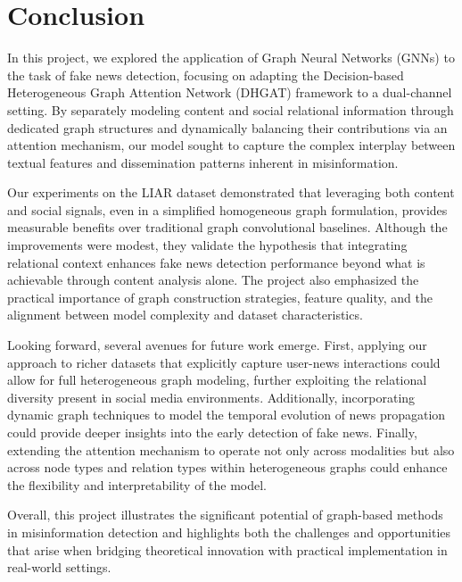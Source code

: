 \section{Conclusion}

In this project, we explored the application of Graph Neural Networks (GNNs) to the task of fake news detection, focusing on adapting the Decision-based Heterogeneous Graph Attention Network (DHGAT) framework to a dual-channel setting. By separately modeling content and social relational information through dedicated graph structures and dynamically balancing their contributions via an attention mechanism, our model sought to capture the complex interplay between textual features and dissemination patterns inherent in misinformation.

Our experiments on the LIAR dataset demonstrated that leveraging both content and social signals, even in a simplified homogeneous graph formulation, provides measurable benefits over traditional graph convolutional baselines. Although the improvements were modest, they validate the hypothesis that integrating relational context enhances fake news detection performance beyond what is achievable through content analysis alone. The project also emphasized the practical importance of graph construction strategies, feature quality, and the alignment between model complexity and dataset characteristics.

Looking forward, several avenues for future work emerge. First, applying our approach to richer datasets that explicitly capture user-news interactions could allow for full heterogeneous graph modeling, further exploiting the relational diversity present in social media environments. Additionally, incorporating dynamic graph techniques to model the temporal evolution of news propagation could provide deeper insights into the early detection of fake news. Finally, extending the attention mechanism to operate not only across modalities but also across node types and relation types within heterogeneous graphs could enhance the flexibility and interpretability of the model.

Overall, this project illustrates the significant potential of graph-based methods in misinformation detection and highlights both the challenges and opportunities that arise when bridging theoretical innovation with practical implementation in real-world settings.
